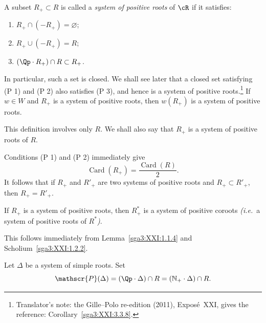 \begin{definition}\label{sga3:XXI:3.2.1}
A subset \(R_+\subset R\) is called a \emph{system of positive roots}
of \(\cR\) if it satisfies:
\begin{enumerate}
\item[(P 1)] \(R_+\cap(-R_+)=\varnothing\);
\item[(P 2)] \(R_+\cup(-R_+)=R\);
\item[(P 3)] \((\Qp\cdot R_+)\cap R\subset R_+\).
\end{enumerate}
In particular, such a set is closed. We shall see later that a closed set satisfying
(P 1) and (P 2) also satisfies (P 3), and hence is a system of
positive roots.\footnote{Translator's note: the Gille--Polo re-edition (2011), Exposé~XXI, gives the reference:
Corollary~\ref{sga3:XXI:3.3.8}.} If \(w\in W\) and \(R_+\) is a system of positive
roots, then \(w(R_+)\) is a system of positive roots.
\end{definition}

\begin{remark}\label{sga3:XXI:3.2.2}
This definition involves only \(R\). We shall also say that \(R_+\)
is a system of positive roots of \(R\).
\end{remark}

\begin{remark}\label{sga3:XXI:3.2.3}
Conditions (P 1) and (P 2) immediately give
\[
 \operatorname{Card}(R_+)=\frac{\operatorname{Card}(R)}{2}.
\]
It follows that if \(R_+\) and \(R'_+\) are two systems of positive
roots and \(R_+\subset R'_+\), then \(R_+=R'_+\).
\end{remark}

\begin{remark}\label{sga3:XXI:3.2.4}
If \(R_+\) is a system of positive roots, then \(R^\ast_+\) is a
system of positive coroots \emph{(i.e.}\ a system of positive roots
of \(R^\ast\)\emph{)}.
\end{remark}

This follows immediately from Lemma~\ref{sga3:XXI:1.1.4} and
Scholium~\ref{sga3:XXI:1.2.2}.

\begin{definition}\label{sga3:XXI:3.2.5}
Let \(\Delta\) be a system of simple roots. Set
\[
 \mathscr{P}(\Delta)
 =(\Qp\cdot\Delta)\cap R
 =(\mathbb N_+\cdot\Delta)\cap R.
\]
\end{definition}
